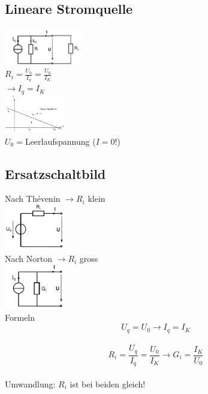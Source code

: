 \subsection{Lineare Stromquelle}
\begin{multicols}{4}
\includegraphics[width=0.25\textwidth]{pics/quellen/lIEquellen}\\
$R_i=\frac{U_0}{I_q}=\frac{U_0}{I_K}$\\
$\rightarrow{I_q} = {I_K}$\\
\includegraphics[width=0.20\textwidth]{pics/quellen/IUkennlinie}\\
$U_0=$Leerlaufspannung ($I=0!$)\\
\end{multicols}

\subsection{Ersatzschaltbild}
\begin{multicols}{3}
Nach Thévenin $\rightarrow R_i$ klein\\
\includegraphics[width=0.2\textwidth]{pics/dcnet/ersatz_spannung}\\
Nach Norton $\rightarrow R_i$ gross\\
\includegraphics[width=0.2\textwidth]{pics/dcnet/ersatz_strom}\\
Formeln\\
$$ U_q = U_0  \rightarrow I_q = I_K $$\\
$$ R_i = \frac{U_q}{I_q} = \frac{U_0}{I_K} \rightarrow G_i = \frac{I_K}{U_0}$$\\
Umwandlung: $R_i$ ist bei beiden gleich!
\end{multicols}

